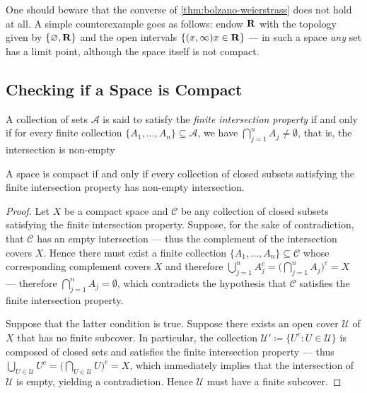 \begin{remark}
\label{rem:bolzano-weierstrass}
One should beware that the converse of \cref{thm:bolzano-weierstrass} does not
hold at all. A simple counterexample goes as follows: endow \(\mathbf{R}\) with the
topology given by \(\{\varnothing, \mathbf{R}\}\) and the open intervals
\(\{(x, \infty) \relax x \in \mathbf{R}\}\) --- in such a space \emph{any} set has a
limit point, although the space itself is not compact.
\end{remark}

\subsection{Checking if a Space is Compact}

\begin{definition}
\label{def:finite-intersection-property}
A collection of sets \(\mathcal{A}\) is said to satisfy the
\emph{finite intersection property} if and only if for every finite collection
\(\{A_1, \dots, A_n\} \subseteq \mathcal{A}\), we have
\(\bigcap_{j=1}^n A_j \neq \emptyset\), that is, the intersection is non-empty
\end{definition}

\begin{proposition}
\label{prop:compact-iff-FIP}
A space is compact if and only if every collection of closed subsets satisfying
the finite intersection property has non-empty intersection.
\end{proposition}

\begin{proof}
Let \(X\) be a compact space and \(\mathcal{C}\) be any collection of closed
subsets satisfying the finite intersection property. Suppose, for the sake of
contradiction, that \(\mathcal{C}\) has an empty intersection --- thus the
complement of the intersection covers \(X\). Hence there must exist a finite
collection \(\{A_1, \dots, A_n\} \subseteq \mathcal{C}\) whose corresponding
complement covers \(X\) and therefore
\(\bigcup_{j=1}^n A_j^c = \big( \bigcap_{j=1}^n A_j \big)^c = X\) --- therefore
\(\bigcap_{j=1}^n A_j = \emptyset\), which contradicts the hypothesis that
\(\mathcal{C}\) satisfies the finite intersection property.

Suppose that the latter condition is true. Suppose there exists an open cover
\(\mathcal{U}\) of \(X\) that has no finite subcover. In particular, the
collection \(\mathcal{U}' \coloneq \{U^c : U \in \mathcal{U}\}\) is composed of
closed sets and satisfies the finite intersection property --- thus \(\bigcup_{U
\in \mathcal{U}} U^c = \big( \bigcap_{U \in \mathcal{U}} U \big)^c = X\), which
immediately implies that the intersection of \(\mathcal{U}\) is empty, yielding
a contradiction. Hence \(\mathcal{U}\) must have a finite subcover.
\end{proof}

